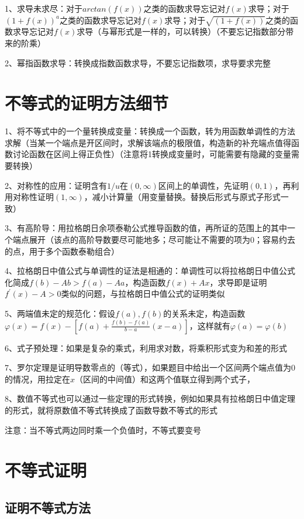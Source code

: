 1、求导未求尽：对于$ arctan(f(x)) $之类的函数求导忘记对$ f(x) $求导；对于$ (1+f(x))^{a} $之类的函数求导忘记对$ f(x) $求导；对于$ \sqrt{(1+f(x))} $之类的函数求导忘记对$ f(x) $求导（与幂形式是一样的，可以转换）（不要忘记指数部分带来的阶乘）

2、幂指函数求导：转换成指数函数求导，不要忘记指数项，求导要求完整

\section{不等式的证明方法细节}

1、将不等式中的一个量转换成变量：转换成一个函数，转为用函数单调性的方法求解（当某一个端点是开区间时，求解该端点的极限值，构造新的补充端点值得函数讨论函数在区间上得正负性）（注意将1转换成变量时，可能需要有隐藏的变量需要转换）

2、对称性的应用：证明含有$ 1/u $在$ (0,\infty) $区间上的单调性，先证明$ (0,1) $，再利用对称性证明$ (1,\infty) $，减小计算量（用变量替换。替换后形式与原式子形式一致）

3、有高阶导：用拉格朗日余项泰勒公式推导函数的值，再所证的范围上的其中一个端点展开（该点的高阶导数要尽可能地多；尽可能让不需要的项为0；容易约去的点，用于多个函数泰勒组合）

4、拉格朗日中值公式与单调性的证法是相通的：单调性可以将拉格朗日中值公式化简成$ f(b)-Ab>f(a)-Aa $，构造函数$ f(x)+Ax $，求导即是证明$ f^{\prime}(x)-A>0 $类似的问题，与拉格朗日中值公式的证明类似

5、两端值未定的规范化：假设$ f(a),f(b) $的关系未定，构造函数$ \varphi(x)=f(x)-\left[f(a)+\frac{f(b)-f(a)}{b-a}(x-a)\right] $，这样就有$ \varphi(a)=\varphi(b) $

6、式子预处理：如果是复杂的乘式，利用求对数，将乘积形式变为和差的形式

7、罗尔定理是证明导数零点的（等式），如果题目中给出一个区间两个端点值为0的情况，用拉定在$ x $（区间的中间值）和这两个值联立得到两个式子，

8、数值不等式也可以通过一些定理的形式转换，例如如果具有拉格朗日中值定理的形式，就将原数值不等式转换成了函数导数不等式的形式

注意：当不等式两边同时乘一个负值时，不等式要变号

\section{不等式证明}



\subsection{证明不等式方法}

